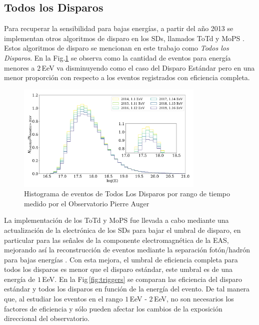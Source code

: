 \subsection{Todos los Disparos}

Para recuperar la sensibilidad para bajas energías, a partir del año 2013  se implementan otros algoritmos de disparo en los SDs, llamados ToTd y MoPS \cite{pierre2013plans}. Estos algoritmos de disparo se mencionan en este trabajo como \textit{Todos los Disparos}.  En la Fig.\ref{fig:TLD} se observa como la cantidad de eventos para energía menores a $2\,$EeV va disminuyendo como el caso del Disparo Estándar pero en una menor proporción con respecto a los eventos registrados con eficiencia completa.

\begin{figure}[H]
	\centering
	\includegraphics[width=0.8\textwidth]{histograma_AllTriggers.pdf}
	\caption{Histograma de eventos de  Todos Los Disparos por rango de tiempo medido por el Observatorio Pierre Auger}
	\label{fig:TLD}
\end{figure}

La implementación de los ToTd y MoPS fue llevada a cabo mediante una actualización de la electrónica de los SDs para bajar el umbral de disparo, en particular para las señales de la componente electromagnética de la EAS, mejorando así la reconstrucción de eventos mediante la separación fotón/hadrón para bajas energías  \cite{pierre2013plans}. Con esta mejora, el umbral de eficiencia completa para todos los disparos es menor que el disparo estándar, este umbral es de una energía de $1\,$EeV. En la Fig\,\ref{fig:triggers} se comparan las eficiencia del disparo estándar y todos los disparos en función de la energía del evento. De tal manera que, al estudiar los eventos en el rango $1\,$EeV - $2\,$EeV,  no son necesarios los factores de eficiencia y sólo pueden afectar los cambios de la exposición direccional del observatorio.


